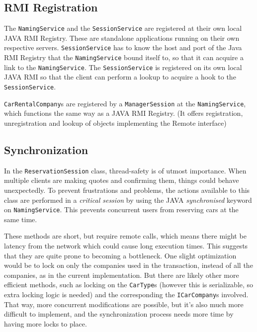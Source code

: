 \documentclass[a4paper]{article}
\begin{document}
\subsection{RMI Registration}
The \texttt{NamingService} and the \texttt{SessionService} are registered at their own local JAVA RMI Registry. These are standalone applications running on their own respective servers. \texttt{SessionService} has to know the host and port of the Java RMI Registry that the \texttt{NamingService} bound itself to, so that it can acquire a link to the \texttt{NamingService}. The \texttt{SessionService} is registered on its own local JAVA RMI so that the client can perform a lookup to acquire a hook to the \texttt{SessionService}.

\texttt{CarRentalCompany}s are registered by a \texttt{ManagerSession} at the \texttt{NamingService}, which functions the same way as a JAVA RMI Registry. (It offers registration, unregistration and lookup of objects implementing the Remote interface)

\subsection{Synchronization}
In the \texttt{ReservationSession} class, thread-safety is of utmost importance. When multiple clients are making quotes and confirming them, things could behave unexpectedly. To prevent frustrations and problems, the actions available to this class are performed in a \emph{critical session} by using the JAVA \emph{synchronised} keyword on \texttt{NamingService}. This prevents concurrent users from reserving cars at the same time.

These methods are short, but require remote calls, which means there might be latency from the network which could cause long execution times. This suggests that they are quite prone to becoming a bottleneck. One slight optimization would be to lock on only the companies used in the transaction, instead of all the companies, as in the current implementation. But there are likely other more efficient methods, such as locking on the \texttt{CarType}s (however this is serializable, so extra locking logic is needed) and the corresponding the \texttt{ICarCompany}s involved. That way, more concurrent modifications are possible, but it's also much more difficult to implement, and the synchronization process needs more time by having more locks to place.
\end{document}
